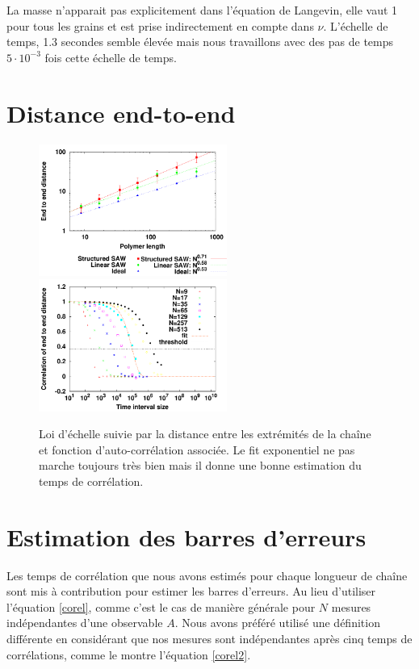 \documentclass[a4paper,11pt]{article}
\begin{document}
La masse n'apparait pas explicitement dans l'équation de Langevin, elle vaut 1 pour tous les grains et est prise indirectement en compte dans $\nu$. L'échelle de temps, 1.3 secondes semble élevée mais nous travaillons avec des pas de temps $5\cdot 10^{-3}$ fois cette échelle de temps.


\section*{Distance end-to-end}

\begin{figure}[H]
\begin{center}
\includegraphics[width=0.55\textwidth]{endtoenddistance.pdf}
\includegraphics[width=0.55\textwidth]{correlendtoend.pdf}

\caption{Loi d'échelle suivie par la distance entre les extrémités de la chaîne et fonction d’auto-corrélation associée. Le fit exponentiel ne pas marche toujours très bien mais il donne une bonne estimation du temps de corrélation.}
\label{endtoend1}
\end{center}
\end{figure}

\section*{Estimation des barres d'erreurs}

Les temps de corrélation que nous avons estimés pour chaque longueur de chaîne sont mis à contribution pour estimer les barres d'erreurs. Au lieu d'utiliser l'équation \ref{corel},
 comme c'est le cas de manière générale pour $N$ mesures indépendantes d'une observable $A$. Nous avons préféré utilisé une définition différente en considérant que nos mesures sont indépendantes après cinq temps de corrélations, comme le montre l'équation \ref{corel2}.
\end{document}
